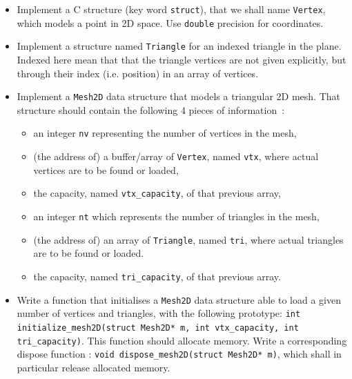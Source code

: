 \documentclass[a4paper,12pt]{article}
\begin{document}
\begin{itemize}

\item[1)] Implement a C structure (key word \texttt{struct}),
  that we shall name \texttt{Vertex}, which models a point in 2D space. Use {\tt double} precision 
  for coordinates.\\[-5pt]

\item[2)] Implement a structure named \texttt{Triangle} for an indexed triangle in the plane. Indexed here mean that   that the triangle vertices are not given explicitly, but through their index (i.e. position) in an array of vertices.\\[-5pt]

\item[3)] Implement a \texttt{Mesh2D} data structure that models a triangular 2D mesh. That structure should contain the following 4 pieces of information~:
  \begin{itemize}
  \item[$\bullet$] an integer \texttt{nv} representing the number of vertices in the mesh,
  \item[$\bullet$] (the address of) a buffer/array of {\tt Vertex}, named \texttt{vtx}, where actual vertices are to be found or loaded,
  \item[$\bullet$] the capacity, named \texttt{vtx\_capacity}, of that previous array,
  \item[$\bullet$] an integer \texttt{nt} which represents the number of triangles in the mesh,
  \item[$\bullet$] (the address of) an array of \texttt{Triangle}, named \texttt{tri}, where actual triangles are to be found or loaded.
  \item[$\bullet$] the capacity, named \texttt{tri\_capacity}, of that previous array.\\[-5pt]
  \end{itemize}

\item[4)] Write a function that initialises a {\tt Mesh2D} data structure able to load a given number of vertices and 
	triangles, with the following prototype: \texttt{int initialize\_mesh2D(struct Mesh2D* m, int vtx\_capacity, int tri\_capacity)}. This function should allocate memory. Write a corresponding dispose function : \texttt{void dispose\_mesh2D(struct Mesh2D* m)}, which shall in particular release allocated memory.\\[-5pt]


\end{itemize}
\end{document}
